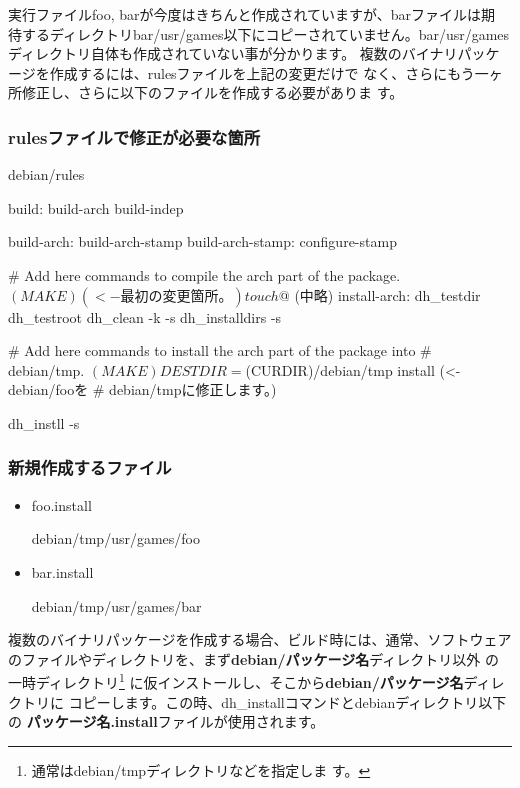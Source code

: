 \documentclass[mingoth,a4paper]{jsarticle}
\begin{document}
実行ファイルfoo, barが今度はきちんと作成されていますが、barファイルは期
待するディレクトリbar/usr/games以下にコピーされていません。bar/usr/games
ディレクトリ自体も作成されていない事が分かります。
複数のバイナリパッケージを作成するには、rulesファイルを上記の変更だけで
なく、さらにもう一ヶ所修正し、さらに以下のファイルを作成する必要がありま
す。
\subsubsection{rulesファイルで修正が必要な箇所}
debian/rules
\begin{commandline}
build: build-arch build-indep

build-arch: build-arch-stamp
build-arch-stamp: configure-stamp

        # Add here commands to compile the arch part of the package.
        $(MAKE) (<-最初の変更箇所。)
        touch $@
(中略)
install-arch:
        dh_testdir
        dh_testroot
        dh_clean -k -s
        dh_installdirs -s

        # Add here commands to install the arch part of the package into
        # debian/tmp.
        $(MAKE) DESTDIR=$(CURDIR)/debian/tmp install (<-debian/fooを
 # debian/tmpに修正します。)

        dh_instll -s
\end{commandline}

\subsubsection{新規作成するファイル}
\begin{itemize}
 \item
      foo.install
      \begin{commandline}
debian/tmp/usr/games/foo
      \end{commandline}
 \item
      bar.install
      \begin{commandline}
debian/tmp/usr/games/bar
      \end{commandline}
\end{itemize}

複数のバイナリパッケージを作成する場合、ビルド時には、通常、ソフトウェア
のファイルやディレクトリを、まず{\bf debian/パッケージ名}ディレクトリ以外
の一時ディレクトリ\footnote{通常はdebian/tmpディレクトリなどを指定しま
す。} に仮インストールし、そこから{\bf debian/パッケージ名}ディレクトリに
コピーします。この時、dh\_installコマンドとdebianディレクトリ以下の{\bf
パッケージ名.install}ファイルが使用されます。
\end{document}
